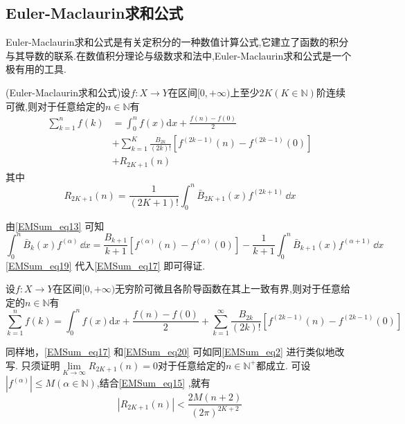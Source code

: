 \subsection{Euler-Maclaurin求和公式}

Euler-Maclaurin求和公式是有关定积分的一种数值计算公式,它建立了函数的积分与其导数的联系.在数值积分理论与级数求和法中,Euler-Maclaurin求和公式是一个极有用的工具.

\begin{theorem}{}
(Euler-Maclaurin求和公式)设$f:X\to Y$在区间$[0,+\infty)$上至少$2K(K\in{\mathbb N})$阶连续可微,则对于任意给定的$n\in\mathbb N$有
\begin{equation}\label{EMSum_eq17}
\begin{aligned}
    \sum_{k=1}^{n}f(k)&=\int_{0}^{n}f(x)\mathrm{d}x+\frac{f(n)-f(0)}{2}\\
    &+\sum_{k=1}^{K}\frac{B_{2k}}{(2k)!}[f^{(2k-1)}(n)-f^{(2k-1)}(0)]\\
    &+R_{2K+1}(n)
\end{aligned}
\end{equation}
其中
\begin{equation}
    R_{2K+1}(n)=\frac{1}{(2K+1)!}\int_{0}^{n}\bar{B}_{2K+1}(x)f^{(2k+1)}\,\dd x
\end{equation}
\end{theorem}
由\autoref{EMSum_eq13} 可知
\begin{equation}\label{EMSum_eq19}
    \int_{0}^{n}\bar{B}_{k}(x)f^{(\alpha)}\,\dd x
    =\frac{B_{k+1}}{k+1}[f^{(\alpha)}(n)-f^{(\alpha)}(0)]
    -\frac{1}{k+1}\int_{0}^{n}\bar{B}_{k+1}(x)f^{(\alpha+1)}\,\dd x
\end{equation}
\autoref{EMSum_eq19} 代入\autoref{EMSum_eq17} 即可得证.
\begin{theorem}{}
设$f:X\to Y$在区间$[0,+\infty)$无穷阶可微且各阶导函数在其上一致有界,则对于任意给定的$n\in\mathbb N$有
\begin{equation}\label{EMSum_eq20}
    \sum_{k=1}^{n}f(k)=\int_{0}^{n}f(x)\mathrm{d}x+\frac{f(n)-f(0)}{2}
    +\sum_{k=1}^{\infty}\frac{B_{2k}}{(2k)!}[f^{(2k-1)}(n)-f^{(2k-1)}(0)]
\end{equation}
\end{theorem}
同样地，\autoref{EMSum_eq17} 和\autoref{EMSum_eq20} 可如同\autoref{EMSum_eq2} 进行类似地改写.
只须证明$\lim\limits_{K\to\infty}R_{2K+1}(n)=0$对于任意给定的$n\in{\mathbb N^{+}}$都成立.
可设$|f^{(\alpha)}|\leqslant M(\alpha\in{\mathbb N})$,结合\autoref{EMSum_eq15} ,就有
\begin{equation}
        |R_{2K+1}(n)|<\frac{2M(n+2)}{(2\pi)^{2K+2}}
\end{equation}
